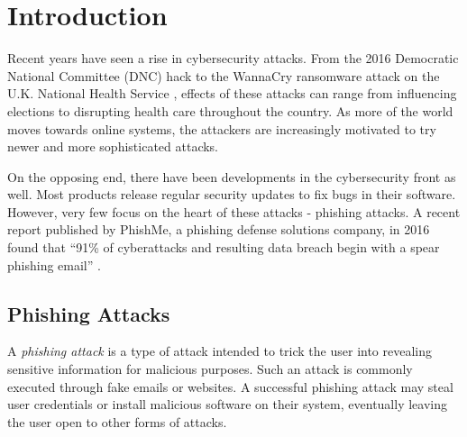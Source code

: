 \chapter{Introduction}

Recent years have seen a rise in cybersecurity attacks. From the 2016 Democratic National Committee (DNC) hack \cite{dnc-hack} to the WannaCry ransomware attack on the U.K. National Health Service \cite{wannacry-uk}, effects of these attacks can range from influencing elections to disrupting health care throughout the country. As more of the world moves towards online systems, the attackers are increasingly motivated to try newer and more sophisticated attacks.

On the opposing end, there have been developments in the cybersecurity front as well. Most products release regular security updates to fix bugs in their software. However, very few focus on the heart of these attacks - phishing attacks. A recent report \cite{phishme-report} published by PhishMe, a phishing defense solutions company, in 2016 found that ``91\% of cyberattacks and resulting data breach begin with a spear phishing email'' \cite{91phishing}.

\section{Phishing Attacks}

A \textit{phishing attack} is a type of attack intended to trick the user into revealing sensitive information for malicious purposes. Such an attack is commonly executed through fake emails or websites.  A successful phishing attack may steal user credentials or install malicious software on their system, eventually leaving the user open to other forms of attacks.

